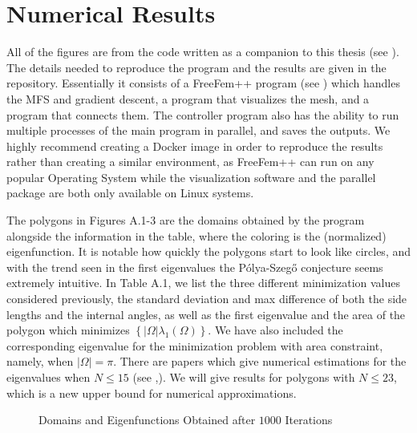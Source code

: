 \appendix

\chapter{Numerical Results}
\thispagestyle{myheadings}

All of the figures are from the code written as a companion to this thesis (see \cite{code}).
The details needed to reproduce the program and the results are given in the repository.
Essentially it consists of a FreeFem++ program (see \cite{freefem}) which handles the MFS and gradient descent, a program that visualizes the mesh, and a program that connects them.
The controller program also has the ability to run multiple processes of the main program in parallel, and saves the outputs.
We highly recommend creating a Docker image in order to reproduce the results rather than creating a similar environment, as FreeFem++ can run on any popular Operating System while the visualization software and the parallel package are both only available on Linux systems.

The polygons in Figures A.1-3 are the domains obtained by the program alongside the information in the table, where the coloring is the (normalized) eigenfunction.
It is notable how quickly the polygons start to look like circles, and with the trend seen in the first eigenvalues the Pólya-Szegő conjecture seems extremely intuitive.
In Table A.1, we list the three different minimization values considered previously, the standard deviation and max difference of both the side lengths and the internal angles, as well as the first eigenvalue and the area of the polygon which minimizes $\left\{ |\Omega| \lambda_{1}(\Omega) \right\} $.
We have also included the corresponding eigenvalue for the minimization problem with area constraint, namely, when $| \Omega | = \pi$.
There are papers which give numerical estimations for the eigenvalues when $N \leq 15$ (see \cite{freitas},\cite{oudet}).
We will give results for polygons with $N \leq 23$, which is a new upper bound for numerical approximations.


\begin{figure}[hbt!]
    \centering



    \caption{Domains and Eigenfunctions Obtained after $1000$ Iterations}
\end{figure}





